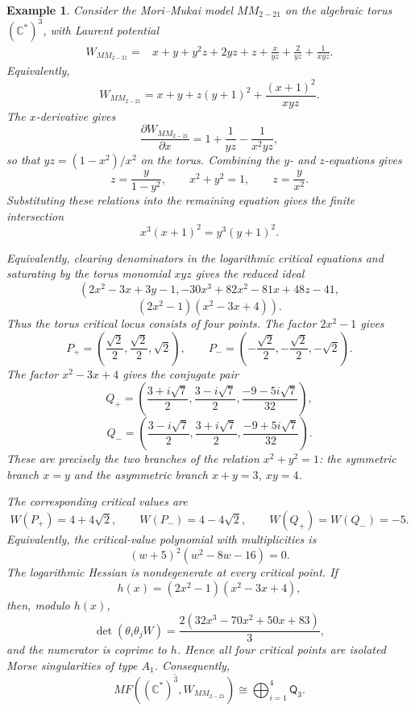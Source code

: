 \documentclass[11pt]{amsart}
\newtheorem{example}{Example}[section]
\newcommand{\MorseCat}[1]{\mathsf{Q}_{#1}}
\begin{document}
\begin{example}
Consider the Mori--Mukai model $MM_{2-21}$ on the algebraic torus
$(\mathbb{C}^*)^3$, with Laurent potential
\begin{align*}
W_{MM_{2-21}}={}&x+y+y^2z+2yz+z+\frac{x}{yz}
+\frac{2}{yz}+\frac{1}{xyz}.
\end{align*}
Equivalently,
\[
W_{MM_{2-21}}=x+y+z(y+1)^2+\frac{(x+1)^2}{xyz}.
\]
The $x$-derivative gives
\[
\frac{\partial W_{MM_{2-21}}}{\partial x}
=1+\frac{1}{yz}-\frac{1}{x^2yz},
\]
so that $yz=(1-x^2)/x^2$ on the torus. Combining the $y$- and
$z$-equations gives
\[
z=\frac{y}{1-y^2},
\qquad
x^2+y^2=1,
\qquad
z=\frac{y}{x^2}.
\]
Substituting these relations into the remaining equation gives the finite
intersection
\[
x^3(x+1)^2=y^3(y+1)^2.
\]

Equivalently, clearing denominators in the logarithmic critical equations and
saturating by the torus monomial $xyz$ gives the reduced ideal
\[
\left(
2x^2-3x+3y-1,
-30x^3+82x^2-81x+48z-41,
\right.
\]
\[
\left.
(2x^2-1)(x^2-3x+4)
\right).
\]
Thus the torus critical locus consists of four points. The factor
$2x^2-1$ gives
\[
P_{+}=\left(\frac{\sqrt{2}}{2},\frac{\sqrt{2}}{2},\sqrt{2}\right),
\qquad
P_{-}=\left(-\frac{\sqrt{2}}{2},-\frac{\sqrt{2}}{2},-\sqrt{2}\right).
\]
The factor $x^2-3x+4$ gives the conjugate pair
\[
Q_{+}=\left(
\frac{3+i\sqrt{7}}{2},
\frac{3-i\sqrt{7}}{2},
\frac{-9-5i\sqrt{7}}{32}
\right),
\]
\[
Q_{-}=\left(
\frac{3-i\sqrt{7}}{2},
\frac{3+i\sqrt{7}}{2},
\frac{-9+5i\sqrt{7}}{32}
\right).
\]
These are precisely the two branches of the relation $x^2+y^2=1$: the
symmetric branch $x=y$ and the asymmetric branch $x+y=3$, $xy=4$.

The corresponding critical values are
\[
W(P_{+})=4+4\sqrt{2},
\qquad
W(P_{-})=4-4\sqrt{2},
\qquad
W(Q_{+})=W(Q_{-})=-5.
\]
Equivalently, the critical-value polynomial with multiplicities is
\[
(w+5)^2(w^2-8w-16)=0.
\]
The logarithmic Hessian is nondegenerate at every critical point. If
\[
h(x)=(2x^2-1)(x^2-3x+4),
\]
then, modulo $h(x)$,
\[
\det(\theta_i\theta_jW)
=\frac{2(32x^3-70x^2+50x+83)}{3},
\]
and the numerator is coprime to $h$. Hence all four critical points are
isolated Morse singularities of type $A_1$. Consequently,
\[
\overline{MF((\mathbb{C}^*)^3,W_{MM_{2-21}})}
\cong \bigoplus_{i=1}^{4}\MorseCat{3}.
\]
\end{example}
\end{document}

